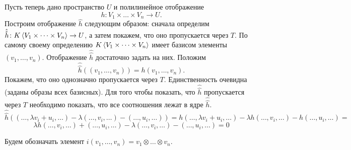 Пусть теперь дано пространство $U$ и полилинейное отображение $$h \colon V_1\times \dots \times V_n \to U.$$
Построим отображение $\hat{h}$ следующим образом: сначала определим $\hat{\hat{h}}\colon K\left\langle V_1 \times \dots \times V_n \right\rangle \to U$, а затем покажем, что оно пропускается через $T$. По самому своему определению $K\left\langle V_1 \times \dots \times V_n \right\rangle$ имеет базисом элементы $(v_1,\dots,v_n)$. Отображение $\hat{\hat{h}}$ достаточно задать на них. Положим $$\hat{\hat{h}}((v_1,\dots,v_n))=h(v_1,\dots,v_n).$$
Покажем, что оно однозначно пропускается через $T$. Единственность очевидна (заданы образы всех базисных). Для того чтобы показать, что $\hat{\hat{h}}$ пропускается через $T$ необходимо показать, что все соотношения лежат в ядре $\hat{\hat{h}}$.
$$\hat{\hat{h}}((\dots, \lambda v_i + u_i, \dots) - \lambda(\dots, v_i, \dots) - (\dots, u_i, \dots))=h(\dots, \lambda v_i + u_i, \dots) - \lambda h(\dots, v_i, \dots) - h(\dots, u_i, \dots) =$$
$$\lambda h(\dots, v_i, \dots) + (\dots, u_i, \dots) - \lambda(\dots, v_i, \dots) - (\dots, u_i, \dots) = 0$$
\endproof
\ethrm

\dfn Будем обозначать элемент $i(v_1,\dots,v_n)=v_1\otimes \dots \otimes v_n$. 
\edfn